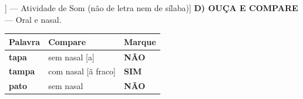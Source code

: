 \begin{exercicio}[Som /ã/ fraco [[6~]] --- Atividade de Som (não de letra nem de sílaba)]
\textbf{D) OUÇA E COMPARE} --- Oral e nasal.

\begin{center}
\begin{tabular}{@{}p{4.2cm}p{6.2cm}p{1.6cm}@{}}
\hline
\textbf{Palavra} & \textbf{Compare} & \textbf{Marque} \\
\hline
\textbf{tapa} & sem nasal [a] & \textbf{NÃO} \\
\textbf{tampa} & com nasal [ã fraco] & \textbf{SIM} \\
\textbf{pato} & sem nasal & \textbf{NÃO} \\
\hline
\end{tabular}
\end{center}

\end{exercicio}

